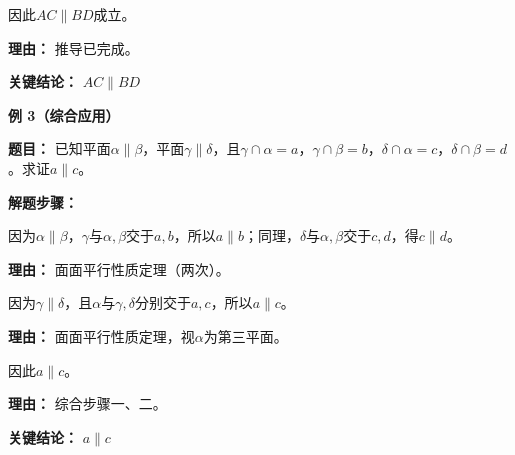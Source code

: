 \begin{examplebox}
\begin{description}[style=nextline, leftmargin=2.8em, labelsep=0.5em, itemsep=0.45em]
		\item[\textbf{第三步（得出结论）：}] 因此$AC\parallel BD$成立。
			\par\textbf{理由：} 推导已完成。
	\end{description}

	\textbf{\textcolor{CExample}{关键结论：}}
	\textbf{$AC\parallel BD$}

	\medskip
	\textbf{\textcolor{CExample}{例 3（综合应用）}}

	\textbf{\textcolor{CExample}{题目：}}
	已知平面$\alpha\parallel\beta$，平面$\gamma\parallel\delta$，且$\gamma\cap\alpha=a$，$\gamma\cap\beta=b$，$\delta\cap\alpha=c$，$\delta\cap\beta=d$。求证$a\parallel c$。

	\textbf{\textcolor{CExample}{解题步骤：}}
	\begin{description}[style=nextline, leftmargin=2.8em, labelsep=0.5em, itemsep=0.45em]
		\item[\textbf{第一步（线线平行推导）：}] 因为$\alpha\parallel\beta$，$\gamma$与$\alpha,\beta$交于$a,b$，所以$a\parallel b$；同理，$\delta$与$\alpha,\beta$交于$c,d$，得$c\parallel d$。
			\par\textbf{理由：} 面面平行性质定理（两次）。

		\item[\textbf{第二步（再次应用定理）：}] 因为$\gamma\parallel\delta$，且$\alpha$与$\gamma,\delta$分别交于$a,c$，所以$a\parallel c$。
			\par\textbf{理由：} 面面平行性质定理，视$\alpha$为第三平面。

		\item[\textbf{第三步（得出结论）：}] 因此$a\parallel c$。
			\par\textbf{理由：} 综合步骤一、二。
	\end{description}

	\textbf{\textcolor{CExample}{关键结论：}}
	\textbf{$a\parallel c$}

\end{examplebox}
